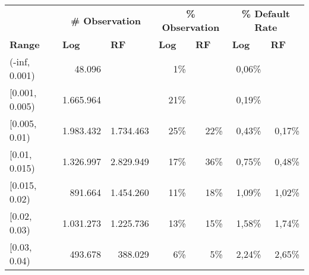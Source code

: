 \begin{table}[H]
\centering
\begin{tabular}{lrrrrrr}\toprule
\textbf{}        & \multicolumn{2}{c}{\textbf{\# Observation}}                                    & \multicolumn{2}{c}{\textbf{\% Observation}}                                    & \multicolumn{2}{c}{\textbf{\% Default Rate}}                                   \\
\textbf{Range}   & \multicolumn{1}{l}{\textbf{Log}} & \multicolumn{1}{l}{\textbf{RF}} & \multicolumn{1}{l}{\textbf{Log}} & \multicolumn{1}{l}{\textbf{RF}} & \multicolumn{1}{l}{\textbf{Log}} & \multicolumn{1}{l}{\textbf{RF}} \\\midrule
(-inf, 0.001)    & 48.096                                 &                                       & 1\%                                    &                                       & 0,06\%                                 &                                       \\
{[}0.001, 0.005) & 1.665.964                              &                                       & 21\%                                   &                                       & 0,19\%                                 &                                       \\
{[}0.005, 0.01)  & 1.983.432                              & 1.734.463                             & 25\%                                   & 22\%                                  & 0,43\%                                 & 0,17\%                                \\
{[}0.01, 0.015)  & 1.326.997                              & 2.829.949                             & 17\%                                   & 36\%                                  & 0,75\%                                 & 0,48\%                                \\
{[}0.015, 0.02)  & 891.664                                & 1.454.260                             & 11\%                                   & 18\%                                  & 1,09\%                                 & 1,02\%                                \\
{[}0.02, 0.03)   & 1.031.273                              & 1.225.736                             & 13\%                                   & 15\%                                  & 1,58\%                                 & 1,74\%                                \\
{[}0.03, 0.04)   & 493.678                                & 388.029                               & 6\%                                    & 5\%                                   & 2,24\%                                 & 2,65\%                                \\

\end{tabular}
\end{table}

